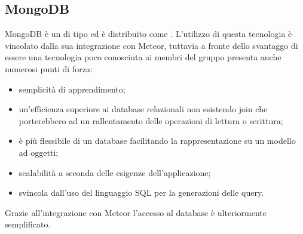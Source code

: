 \subsection{MongoDB}
MongoDB è un    di tipo  ed è distribuito come  . L'utilizzo di questa tecnologia è vincolato dalla sua integrazione con Meteor, tuttavia a fronte dello svantaggo di essere una tecnologia poco conosciuta ai membri del gruppo presenta anche numerosi punti di forza:
\begin{itemize}
	\item semplicità di apprendimento;
	\item un'efficienza superiore ai database relazionali non esistendo join che porterebbero ad un rallentamento delle operazioni di lettura o scrittura; 
	\item è più flessibile di un database  facilitando la rappresentazione su un modello ad oggetti;
	\item scalabilità a seconda delle esigenze dell’applicazione;
	\item svincola dall’uso del linguaggio SQL per la generazioni delle query.
\end{itemize}
Grazie all'integrazione con Meteor l'accesso al database è ulteriormente semplificato.

